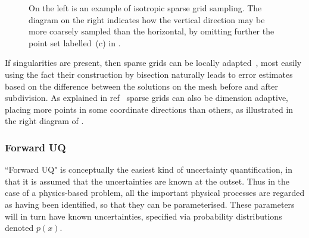 \begin{figure}
\centerline{
}
\caption{\label{fig:stog}
On the left is an example of isotropic sparse grid sampling.
The diagram on the right indicates how the vertical direction may
be more coarsely sampled than the horizontal, by omitting further
the point set labelled~(c) in .}
\end{figure}
If singularities are present, then sparse grids can be locally
adapted~\cite[end \S\,4]{Bu04Spar}, most easily using the fact their
construction by bisection naturally leads to error estimates
based on the difference between the solutions on the mesh
before and after subdivision.
As explained in ref~\cite{Ge03Dime} sparse
grids can also be dimension adaptive, placing more points in
some coordinate directions than others, as illustrated in the right diagram of .

\subsubsection{Forward UQ}\label{sec:forward}
``Forward UQ" is conceptually the easiest kind of uncertainty quantification,
in that it is assumed that the uncertainties are known at the outset. Thus in the case
of a physics-based problem, all the important physical processes are regarded
as having been identified, so that they can be parameterised. These parameters will 
in turn have known uncertainties, specified via probability distributions denoted $p(x)$.

